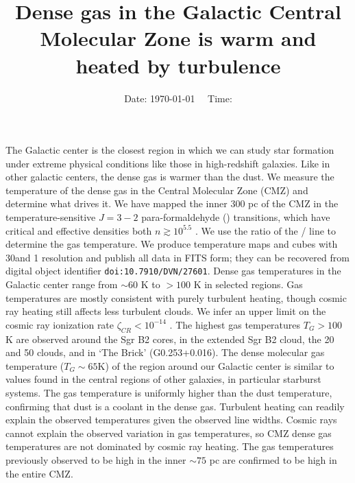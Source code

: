 



\title{Dense gas in the Galactic Central Molecular Zone is warm and heated by turbulence}


\date{Date: \today ~~ Time: \currenttime}

\abstract
{The Galactic center is the closest region in which we can study star formation
under extreme physical conditions like those in high-redshift galaxies.  Like
in other galactic centers, the dense gas is warmer than the dust.}
{We measure the temperature of the dense gas in the Central Molecular Zone
(CMZ) and determine what drives it.}
{We have mapped the inner 300 pc of the CMZ in the temperature-sensitive
$J=3-2$ para-formaldehyde (\para) transitions, which have critical and effective
densities both $n\gtrsim10^{5.5}$ \percc.  We use the ratio of the
\threetwoone / \threeohthree line to determine the gas temperature.
We produce temperature maps and cubes with 30\arcsec and 1 \kms resolution and
publish all data in FITS form; they can be recovered from digital object
identifier \texttt{doi:10.7910/DVN/27601}.}
{Dense gas temperatures in the Galactic center range from $\sim60$ K to $>100$ K in
selected regions.  Gas temperatures are mostly consistent with purely turbulent
heating, though cosmic ray heating still affects less turbulent clouds.  We
infer an upper limit on the cosmic ray ionization rate $\zeta_{CR}<10^{-14}$
\pers.  The highest gas temperatures $T_G>100$ K are observed around the Sgr B2
cores, in the extended Sgr B2 cloud, the 20 \kms and 50 \kms clouds, and in
`The Brick' (G0.253+0.016).
}
{
The dense molecular gas temperature ($T_G\sim 65$K) of the region around our
Galactic center is similar to values found in the central regions of other
galaxies, in particular starburst systems.  The gas temperature is uniformly
higher than the dust temperature, confirming that dust is a coolant in the
dense gas.  Turbulent heating can readily explain the observed temperatures
given the observed line widths.  Cosmic rays cannot explain the observed
variation in gas temperatures, so CMZ dense gas temperatures are not dominated
by cosmic ray heating.  The gas temperatures previously observed to be high
in the inner $\sim75$ pc are confirmed to be high in the entire CMZ.}



